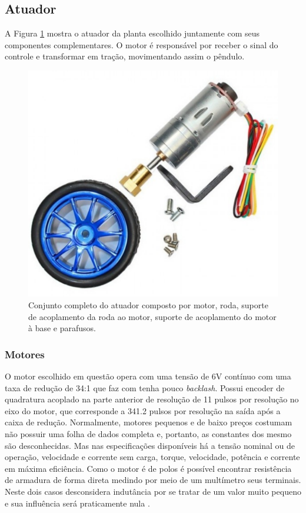 \subsection{Atuador}

A Figura \ref{fig:KitMotor} mostra o atuador da planta escolhido juntamente com seus componentes complementares. O motor é responsável por receber o sinal do controle e transformar em tração, movimentando assim o pêndulo.
\begin{figure}[!htb]
    \centering
    \includegraphics[scale=0.45]{Metodologia/KitMotor}
    \caption{Conjunto completo do atuador composto por motor, roda, suporte de acoplamento da roda ao motor, suporte de acoplamento do motor à base e parafusos.}
    \label{fig:KitMotor}
\end{figure}

\subsubsection{Motores}

O motor escolhido em questão opera com uma tensão de 6V contínuo com uma taxa de redução de 34:1 que faz com tenha pouco \textit{backlash}. Possui encoder de quadratura acoplado na parte anterior de resolução de 11 pulsos por resolução no eixo do motor, que corresponde a 341.2 pulsos por resolução na saída após a caixa de redução. Normalmente, motores pequenos e de baixo preços costumam não possuir uma folha de dados completa e, portanto, as constantes dos mesmo são desconhecidas. Mas nas especificações disponíveis há a tensão nominal ou de operação, velocidade e corrente sem carga, torque, velocidade, potência e corrente em máxima eficiência. Como o motor é de polos é possível encontrar resistência de armadura de forma direta medindo por meio de um multímetro seus terminais. Neste dois casos desconsidera indutância por se tratar de um valor muito pequeno e sua influência será praticamente nula \cite{Sundin:12}.

